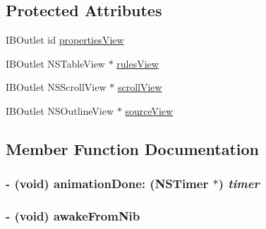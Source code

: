 \subsection*{Protected Attributes}
\begin{CompactItemize}
\item 
IBOutlet id \hyperlink{interface_c_m_rules_view_controller_ab511e1066292c82ecbd7187c5dd1864}{propertiesView}
\item 
IBOutlet NSTableView $\ast$ \hyperlink{interface_c_m_rules_view_controller_161aabbfe4b9b65705556ffaff0dd9e4}{rulesView}
\item 
IBOutlet NSScrollView $\ast$ \hyperlink{interface_c_m_rules_view_controller_31993d58dfd51aaa2674586ecc227639}{scrollView}
\item 
IBOutlet NSOutlineView $\ast$ \hyperlink{interface_c_m_rules_view_controller_3c85b2976be441808b68898aaf1224d9}{sourceView}
\end{CompactItemize}


\subsection{Member Function Documentation}
\hypertarget{interface_c_m_rules_view_controller_8a78381207d0ccc077468c8d58345d3f}{
\subsubsection[animationDone:]{\setlength{\rightskip}{0pt plus 5cm}- (void) animationDone: (NSTimer $\ast$) {\em timer}}}
\label{interface_c_m_rules_view_controller_8a78381207d0ccc077468c8d58345d3f}


\hypertarget{interface_c_m_rules_view_controller_62e036822b9cdb8fc4a5621e4b8f5410}{
\subsubsection[awakeFromNib]{\setlength{\rightskip}{0pt plus 5cm}- (void) awakeFromNib }}
\label{interface_c_m_rules_view_controller_62e036822b9cdb8fc4a5621e4b8f5410}


